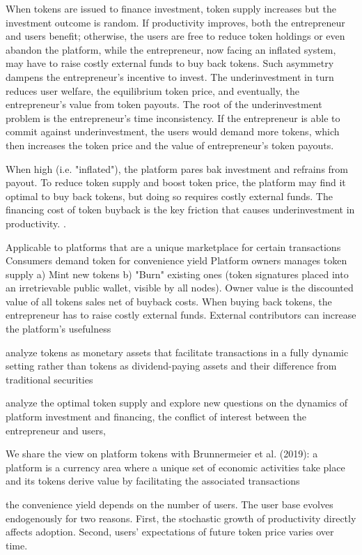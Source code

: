 {When tokens are issued to finance investment, token supply increases but the investment outcome is random. If productivity improves, both the entrepreneur and users benefit; otherwise, the users are free to reduce token holdings or even abandon the platform, while the entrepreneur, now facing an inflated system, may have to raise costly external funds to buy back tokens. Such asymmetry dampens the entrepreneur's incentive to invest. The underinvestment in turn reduces user welfare, the equilibrium token price, and eventually, the entrepreneur's value from token payouts. The root of the underinvestment problem is the entrepreneur's time inconsistency. If the entrepreneur is able to commit against underinvestment, the users would demand more tokens, which then increases the token price and the value of entrepreneur's token payouts.

When high (i.e. "inflated"), the platform pares bak investment and refrains from payout. To reduce token supply and boost token price, the platform may find it optimal to buy back tokens, but doing so requires costly external funds. The financing cost of token buyback is the key friction that causes underinvestment in productivity. .

Applicable to platforms that are a unique marketplace for certain transactions Consumers demand token for convenience yield Platform owners manages token supply a) Mint new tokens b) "Burn" existing ones (token signatures placed into an irretrievable public wallet, visible by all nodes). Owner value is the discounted value of all tokens sales net of buyback costs. When buying back tokens, the entrepreneur has to raise costly external funds. External contributors can increase the platform's usefulness

analyze tokens as monetary assets that facilitate transactions in a fully dynamic setting rather than tokens as dividend-paying assets and their difference from traditional securities

analyze the optimal token supply and explore new questions on the dynamics of platform investment and financing, the conflict of interest between the entrepreneur and users,


We share the view on platform tokens with Brunnermeier et al. (2019): a platform is a currency area where a unique set of economic activities take place and its tokens derive value by facilitating the associated transactions

the convenience yield depends on the number of users. The user base evolves endogenously for two reasons. First, the stochastic growth of productivity directly affects adoption. Second, users' expectations of future token price varies over time.

}
